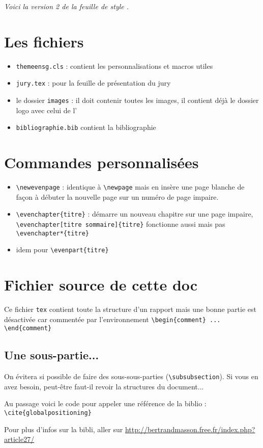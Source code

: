 
\textit{Voici la version 2 de la feuille de style \ensg. }

\section{Les fichiers}
\begin{itemize}
\item \texttt{themeensg.cls} : contient les personnalisations et macros utiles
\item \texttt{jury.tex} : pour la feuille de présentation du jury
\item le dossier \texttt{images} : il doit contenir toutes les images, il contient déjà le dossier logo avec celui de l'\ensg
\item \texttt{bibliographie.bib} contient la bibliographie
\end{itemize}

\section{Commandes personnalisées}

\begin{itemize}
\item \verb!\newevenpage! : identique à \verb!\newpage! mais en insère une page blanche de façon à débuter la nouvelle page sur un numéro de page impaire.
\item \verb!\evenchapter{titre}! : démarre un nouveau chapitre sur une page impaire,\\ \verb!\evenchapter[titre sommaire]{titre}!   fonctionne aussi mais pas \verb!\evenchapter*{titre}!
\item idem pour \verb!\evenpart{titre}!
\end{itemize}

\section{Fichier source de cette doc}
Ce fichier \texttt{tex} contient toute la structure d'un rapport mais une bonne partie est désactivée car commentée par l'environnement \verb!\begin{comment} ... \end{comment}!

\subsection{Une sous-partie...}

On évitera si possible de faire des sous-sous-parties (\verb!\subsubsection!). Si vous en avez besoin, peut-être faut-il revoir la structures du document...

Au passage voici le code pour appeler une référence de la biblio \cite{globalpositioning} : \verb!\cite{globalpositioning}!

Pour plus d'infos sur la bibli, aller sur \url{http://bertrandmasson.free.fr/index.php?article27/}
